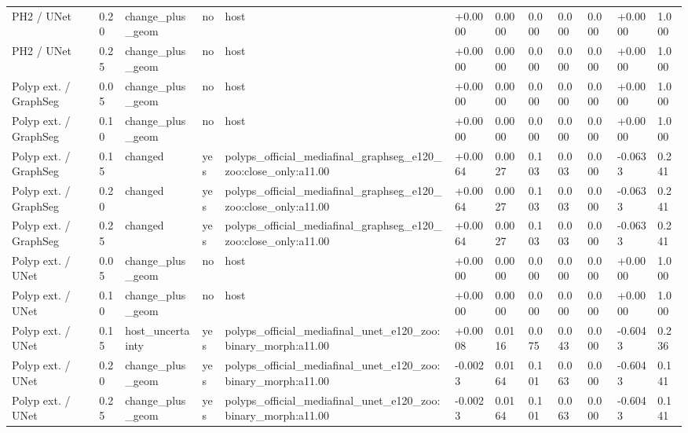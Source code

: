 \begin{table}[t]
\begin{tabular}{llllllllllll}
PH2 / UNet & 0.20 & change\_plus\_geom & no & host & +0.0000 & 0.0000 & 0.000 & 0.000 & 0.000 & +0.0000 & 1.000 \\
PH2 / UNet & 0.25 & change\_plus\_geom & no & host & +0.0000 & 0.0000 & 0.000 & 0.000 & 0.000 & +0.0000 & 1.000 \\
Polyp ext. / GraphSeg & 0.05 & change\_plus\_geom & no & host & +0.0000 & 0.0000 & 0.000 & 0.000 & 0.000 & +0.0000 & 1.000 \\
Polyp ext. / GraphSeg & 0.10 & change\_plus\_geom & no & host & +0.0000 & 0.0000 & 0.000 & 0.000 & 0.000 & +0.0000 & 1.000 \\
Polyp ext. / GraphSeg & 0.15 & changed & yes & polyps\_official\_mediafinal\_graphseg\_e120\_zoo:close\_only:a11.00 & +0.0064 & 0.0027 & 0.103 & 0.003 & 0.000 & -0.0633 & 0.241 \\
Polyp ext. / GraphSeg & 0.20 & changed & yes & polyps\_official\_mediafinal\_graphseg\_e120\_zoo:close\_only:a11.00 & +0.0064 & 0.0027 & 0.103 & 0.003 & 0.000 & -0.0633 & 0.241 \\
Polyp ext. / GraphSeg & 0.25 & changed & yes & polyps\_official\_mediafinal\_graphseg\_e120\_zoo:close\_only:a11.00 & +0.0064 & 0.0027 & 0.103 & 0.003 & 0.000 & -0.0633 & 0.241 \\
Polyp ext. / UNet & 0.05 & change\_plus\_geom & no & host & +0.0000 & 0.0000 & 0.000 & 0.000 & 0.000 & +0.0000 & 1.000 \\
Polyp ext. / UNet & 0.10 & change\_plus\_geom & no & host & +0.0000 & 0.0000 & 0.000 & 0.000 & 0.000 & +0.0000 & 1.000 \\
Polyp ext. / UNet & 0.15 & host\_uncertainty & yes & polyps\_official\_mediafinal\_unet\_e120\_zoo:binary\_morph:a11.00 & +0.0008 & 0.0116 & 0.075 & 0.043 & 0.000 & -0.6043 & 0.236 \\
Polyp ext. / UNet & 0.20 & change\_plus\_geom & yes & polyps\_official\_mediafinal\_unet\_e120\_zoo:binary\_morph:a11.00 & -0.0023 & 0.0164 & 0.101 & 0.063 & 0.000 & -0.6043 & 0.141 \\
Polyp ext. / UNet & 0.25 & change\_plus\_geom & yes & polyps\_official\_mediafinal\_unet\_e120\_zoo:binary\_morph:a11.00 & -0.0023 & 0.0164 & 0.101 & 0.063 & 0.000 & -0.6043 & 0.141 \\
\bottomrule
\end{tabular}
\end{table}
